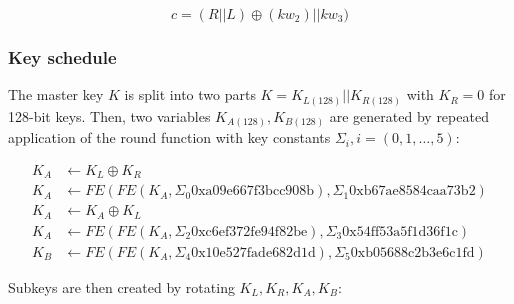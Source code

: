 \[
    c=(R||L)\oplus (kw_2)||kw_3)
\]

\subsubsection{Key schedule}

The master key $K$ is split into two parts $K=K_{L(128)}||K_{R(128)}$ with
$K_R=0$ for 128-bit keys. Then, two variables $K_{A(128)},K_{B(128)}$ are
generated by repeated application of the round function with key constants
$\Sigma_i,i=(0,1,\dots,5)$:

\begin{align*}
    K_A&\leftarrow K_L\oplus K_R \\
    K_A&\leftarrow FE(FE(K_A, \Sigma_0\mathrm{0xa09e667f3bcc908b}), \Sigma_1\mathrm{0xb67ae8584caa73b2}) \\
    K_A&\leftarrow K_A\oplus K_L \\
    K_A&\leftarrow FE(FE(K_A, \Sigma_2\mathrm{0xc6ef372fe94f82be}), \Sigma_3\mathrm{0x54ff53a5f1d36f1c}) \\
    K_B&\leftarrow FE(FE(K_A, \Sigma_4\mathrm{0x10e527fade682d1d}), \Sigma_5\mathrm{0xb05688c2b3e6c1fd})
\end{align*}

Subkeys are then created by rotating $K_L,K_R,K_A,K_B$:

